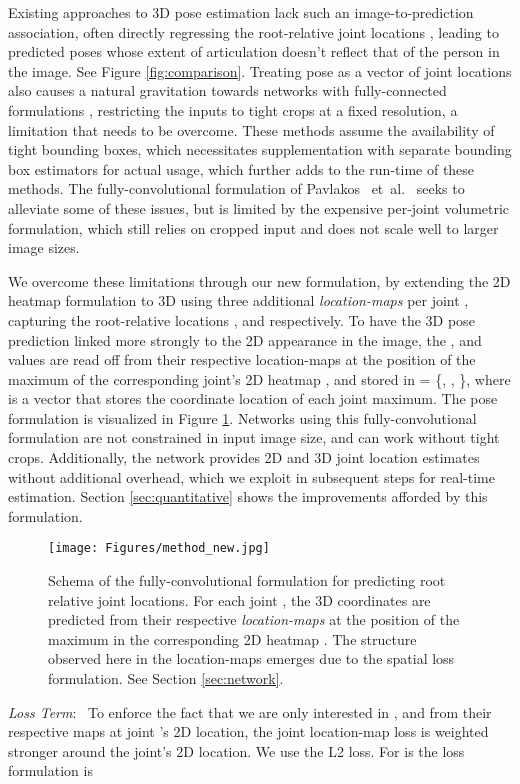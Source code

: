 \documentclass[acmtog]{acmart}
\newcommand{\parahead}[1]{\vspace{5pt}\noindent\emph{#1}:\ }
\newcommand{\etal}{~et~al.\ }
\newcommand{\change}[1]{{#1}}
\begin{document}
Existing approaches to 3D pose estimation lack such an image-to-prediction association, often directly regressing the root-relative joint locations \cite{ionescu_iterated_cvpr14}, leading to predicted poses whose extent of articulation doesn't reflect that of the person in the image. See Figure \ref{fig:comparison}. Treating pose as a vector of joint locations also causes a natural gravitation towards networks with fully-connected formulations \cite{tekin_structured_bmvc16,mehta_mlc3d_arxiv16,rogez_mocap_arxiv16,yu_mono_heightmap_eccv16}, restricting the inputs to tight crops at a fixed resolution, a limitation that needs to be overcome. These methods assume the availability of tight bounding boxes, which necessitates supplementation with separate bounding box estimators for actual usage, which further adds to the run-time of these methods. The fully-convolutional formulation of Pavlakos \etal \cite{pavlakos_volumetric3d_arxiv16} seeks to alleviate some of these issues, but is limited by the expensive per-joint volumetric formulation, which \change{still relies on cropped input} and does not scale well to larger image sizes.

We overcome these limitations through our new formulation, by extending the 2D heatmap formulation to 3D using three additional \textit{location-maps}  per joint , capturing the root-relative locations ,  and   respectively. To have the 3D pose prediction linked more strongly to the 2D appearance in the image, the ,  and  values are read off from their respective location-maps at the position of the maximum of the corresponding joint's 2D heatmap , and stored in  = \{, , \}, where  is a vector that stores the coordinate  location of each joint maximum.
The pose formulation is visualized in Figure \ref{fig:pose_formulation}. Networks using this fully-convolutional formulation are not constrained in input image size, and can work without tight crops. Additionally, the network provides 2D and 3D joint location estimates without additional overhead, which we exploit in \change{subsequent steps} for real-time estimation.
Section \ref{sec:quantitative} shows the improvements afforded by this formulation.


\begin{figure}[]
\centering\texttt{[image: Figures/method\_new.jpg]}
	\caption{Schema of the fully-convolutional formulation for predicting root relative joint locations. For each joint , the 3D coordinates are predicted from their respective \textit{location-maps}  at the position of the maximum in the corresponding 2D heatmap . The structure observed here in the location-maps emerges due to the spatial loss formulation. See Section \ref{sec:network}.}
	\label{fig:pose_formulation}
\end{figure}
\parahead{Loss Term}
To enforce the fact that we are only interested in ,  and  from their respective maps at joint 's 2D location, the joint location-map loss is weighted stronger around the joint's 2D location. 
We use the L2 loss. For  is the loss formulation is
\end{document}

